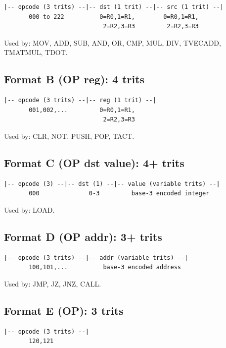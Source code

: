 \documentclass[12pt,a4paper,twoside]{book}
\theoremstyle{trinarytheorem}
\theoremstyle{trinarydefinition}
\begin{document}
\begin{verbatim}
|-- opcode (3 trits) --|-- dst (1 trit) --|-- src (1 trit) --|
       000 to 222          0=R0,1=R1,        0=R0,1=R1,
                            2=R2,3=R3         2=R2,3=R3
\end{verbatim}

Used by: MOV, ADD, SUB, AND, OR, CMP, MUL, DIV, TVECADD, TMATMUL, TDOT.

\subsection{Format B (OP reg): 4 trits}

\begin{verbatim}
|-- opcode (3 trits) --|-- reg (1 trit) --|
       001,002,...         0=R0,1=R1,
                            2=R2,3=R3
\end{verbatim}

Used by: CLR, NOT, PUSH, POP, TACT.

\subsection{Format C (OP dst value): 4+ trits}

\begin{verbatim}
|-- opcode (3) --|-- dst (1) --|-- value (variable trits) --|
       000              0-3         base-3 encoded integer
\end{verbatim}

Used by: LOAD.

\subsection{Format D (OP addr): 3+ trits}

\begin{verbatim}
|-- opcode (3 trits) --|-- addr (variable trits) --|
       100,101,...          base-3 encoded address
\end{verbatim}

Used by: JMP, JZ, JNZ, CALL.

\subsection{Format E (OP): 3 trits}

\begin{verbatim}
|-- opcode (3 trits) --|
       120,121
\end{verbatim}
\end{document}
